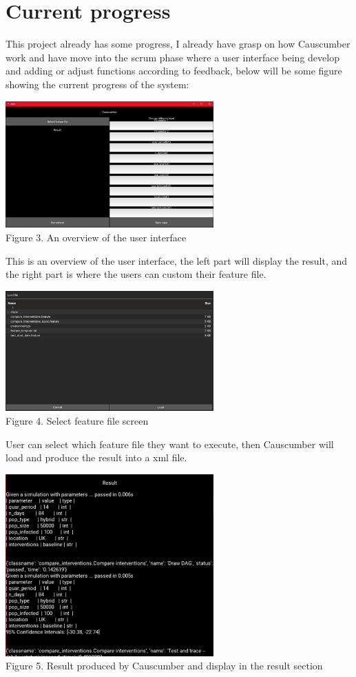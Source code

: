 \section{Current progress}

This project already has some progress, I already have grasp on how Causcumber work and have move into the scrum phase where a user interface being develop and adding or adjust functions according to feedback, below will be some figure showing the current progress of the system:
\begin{center}
	\includegraphics[width=8cm]{figures/Gui_overview.png}\\
	Figure 3. An overview of the user interface
\end{center}
This is an overview of the user interface, the left part will display the result, and the right part is where the users can custom their feature file.
\begin{center}
	\includegraphics[width=8cm]{figures/select_feature_file.png}\\
	Figure 4. Select feature file screen
\end{center}
User can select which feature file they want to execute, then Causcumber will load and produce the result into a xml file.
\begin{center}
	\includegraphics[width=8cm]{figures/Result_display.png}\\
	Figure 5. Result produced by Causcumber and display in the result section
\end{center}
